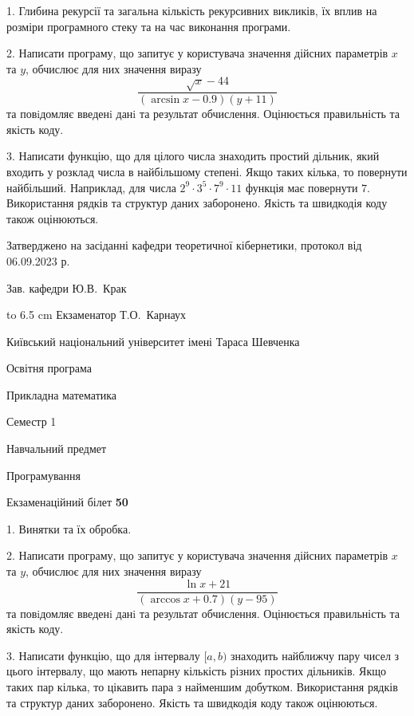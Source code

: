 \documentclass[12pt, ukrainian]{article}
\begin{document}
{%
1. Глибина рекурсії та загальна кількість рекурсивних викликів, їх вплив на розміри програмного стеку та на час виконання програми.%
\par
2. Написати програму, що запитує у користувача значення дійсних параметрів $x$ та $y$, обчислює для них значення виразу 
$$\frac{\sqrt x - 44}{(\arcsin x - 0.9) (y + 11)}$$ 
та повiдомляє введенi данi та результат обчислення.
 Оцінюється правильність та якість коду.

\par
3. Написати функцію, що для цілого числа знаходить простий дільник, який входить у розклад числа в найбільшому степені. Якщо таких кілька, то повернути найбільший. Наприклад, для числа $2^{9}{\cdot}3^5{\cdot}7^9{\cdot}11$ функція має повернути $7$.  Використання рядків та структур даних заборонено. Якість та швидкодія коду також оцінюються. 

}
{\smallskip\smallskip \begin {scriptsize} Затверджено на засіданні кафедри теоретичної кібернетики, протокол   від   06.09.2023 р.\par\smallskip\smallskip\smallskip\smallskip
{\parbox {6.5 cm} {Зав. кафедри \dotfill Ю.В.~Крак}}\hspace {0.7cm} {\hbox to 6.5 cm { Екзаменатор \dotfill Т.О.~Карнаух}} \end{scriptsize}}
\vspace{0.9cm}
{{\begin {scriptsize}\par
{ \center  Київський національний університет імені Тараса Шевченка \par}
{\parbox {5 cm}{Освітня програма \hfill}{\parbox {7 cm}{Прикладна математика\hfill}}\parbox {6 cm}{\hfill Семестр 1}}\par
{\parbox {5 cm} {Навчальний предмет \hfill}\parbox {7 cm}{Програмування \hfill}\parbox {6cm}{\hfill}\par}\vspace{-15pt} \end{scriptsize}}{\center Екзаменаційний білет \No \textbf { 50 }\par}}
{%
1. Винятки та їх обробка.%
\par
2. Написати програму, що запитує у користувача значення дійсних параметрів $x$ та $y$, обчислює для них значення виразу 
$$\frac{\ln x + 21}{(\arccos x + 0.7) (y - 95)}$$ 
та повiдомляє введенi данi та результат обчислення.
 Оцінюється правильність та якість коду.

\par
3. Написати функцію, що для інтервалу $[a, b)$ знаходить найближчу пару чисел з цього інтервалу, що мають непарну кількість різних простих дільників. Якщо таких пар кілька, то цікавить пара з найменшим добутком.  Використання рядків та структур даних заборонено. Якість та швидкодія коду також оцінюються. 

}
\end{document}
